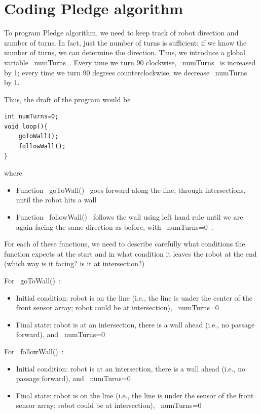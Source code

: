 \documentclass[oneside]{stml-l}
\numberwithin{figure}{chapter}
\begin{document}
\section{Coding Pledge algorithm}
To program Pledge algorithm, we need to keep track of robot direction
and number of turns. In fact, just the number of turns is sufficient: if we
know the number of turns, we can determine the direction. Thus, we introduce
a global variable ~numTurns~. Every time we turn 90 clockwise, ~numTurns~
is increased by 1;  every time we turn 90 degrees counterclockwise, we decrease
~numTurns~ by  1.

Thus, the draft of the program would be
\begin{lstlisting}
int numTurns=0;
void loop(){
    goToWall();
    followWall();
}
\end{lstlisting}
where
\begin{itemize}
\item Function ~goToWall()~ goes forward along the line, through
intersections, until the robot hits a wall
\item Function ~followWall()~ follows the wall using left hand rule
until we are again facing the same direction as before, with ~numTurns=0~.
\end{itemize}

For each of  these functions, we need to describe carefully what
conditions the function expects at the start and in what condition
it leaves the robot at the end (which way is it facing? is it at intersection?)

For ~goToWall()~:

\begin{itemize}
\item Initial condition: robot is on the line (i.e., the line is under the
center of the front sensor array; robot could be at intersection), ~numTurns=0~
\item Final state: robot is at an intersection, there is a wall ahead
(i.e., no passage forward), and  ~numTurns=0~
\end{itemize}

For ~followWall()~:
\begin{itemize}
\item Initial condition: robot is at an intersection, there is a wall ahead
(i.e., no passage forward), and  ~numTurns=0~
\item Final state: robot is on the line (i.e., the line is under the
sensor of the front sensor array; robot could be at intersection), ~numTurns=0~
\end{itemize}
\end{document}
